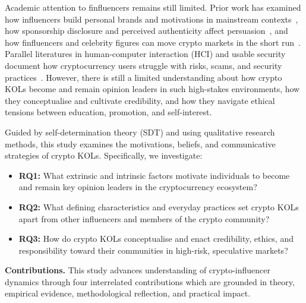 Academic attention to finfluencers remains still limited. Prior work has examined how influencers build personal brands and motivations in mainstream contexts~\cite{torhonen2019}, how sponsorship disclosure and perceived authenticity affect persuasion~\cite{boerman2017}, and how finfluencers and celebrity figures can move crypto markets in the short run~\cite{Merkley2024,AnteMuskCrypto2023}. Parallel literatures in human-computer interaction (HCI) and usable security document how cryptocurrency users struggle with risks, scams, and security practices~\cite{Krombholz2016,Mai2020,SasKhairuddin2017,Abramova2021}. However, there is still a limited understanding about how crypto KOLs become and remain opinion leaders in such high-stakes environments, how they conceptualise and cultivate credibility, and how they navigate ethical tensions between education, promotion, and self-interest.

Guided by self-determination theory (SDT) \citep{deci2000} and using qualitative research methods, this study examines the motivations, beliefs, and communicative strategies of crypto KOLs. Specifically, we investigate:
\begin{itemize}
  \item \textbf{RQ1:} What extrinsic and intrinsic factors motivate individuals to become and remain key opinion leaders in the cryptocurrency ecosystem?
  \item \textbf{RQ2:} What defining characteristics and everyday practices set crypto KOLs apart from other influencers and members of the crypto community?
  \item \textbf{RQ3:} How do crypto KOLs conceptualise and enact credibility, ethics, and responsibility toward their communities in high-risk, speculative markets?
\end{itemize}

\noindent \textbf{Contributions.} This study advances understanding of crypto-influencer dynamics through four interrelated contributions which are grounded in theory, empirical evidence, methodological reflection, and practical impact.

